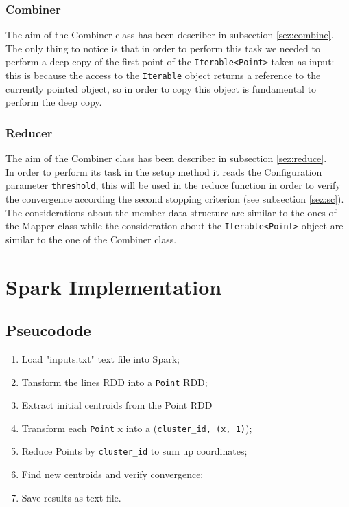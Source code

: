 \documentclass[11pt,a4paper]{article}
\begin{document}
\subsubsection{Combiner}
The aim of the Combiner class has been describer in subsection \ref{sez:combine}.
The only thing to notice is that in order to perform this task we needed to perform a deep copy of the first point of the \texttt{Iterable<Point>} taken as input: this is because the access to the \texttt{Iterable} object returns a reference to the currently pointed object, so in order to copy this object is fundamental to perform the deep copy.
\subsubsection{Reducer}
The aim of the Combiner class has been describer in subsection \ref{sez:reduce}.\\
In order to perform its task in the setup method it reads the Configuration parameter \texttt{threshold}, this will be used in the reduce function in order to verify the convergence according the second stopping criterion (see subsection \ref{sez:sc}).
The considerations about the member data structure are similar to the ones of the Mapper class while the consideration about the \texttt{Iterable<Point>} object are similar to the one of the Combiner class.
\section{Spark Implementation}\label{sez:spark}
\subsection{Pseucodode}
\begin{enumerate}
	\item Load "inputs.txt" text file into Spark;
	\item Tansform the lines RDD into a \texttt{Point} RDD;
	\item Extract initial centroids from the Point RDD
	
	\item Transform each \texttt{Point} x into a (\texttt{cluster\_id, (x, 1)});
	\item Reduce Points by \texttt{cluster\_id} to sum up coordinates;
	\item Find new centroids and verify convergence;
	
	\item Save results as text file.
\end{enumerate}
\end{document}
